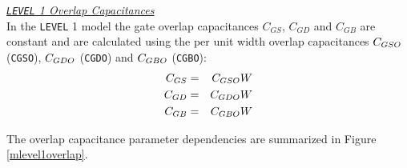 \noindent\underline{\sl \large {\tt LEVEL} 1 Overlap Capacitances}\\[0.1in]
In the {\tt LEVEL} 1 model the gate overlap capacitances $C_{GS}$, $C_{GD}$ and
$C_{GB}$ are constant and are calculated using the per unit width overlap
capacitances $C_{GSO}$ ({\tt CGSO}), $C_{GDO}$ ({\tt CGDO}) and $C_{GBO}$
({\tt CGBO}):
\begin{eqnarray}
C_{GS}&=&C_{GSO}W \\
C_{GD}&=&C_{GDO}W \\
C_{GB}&=&C_{GBO}W
\end{eqnarray}
{The overlap capacitance parameter dependencies
are summarized in Figure \ref{mlevel1overlap}.

}
